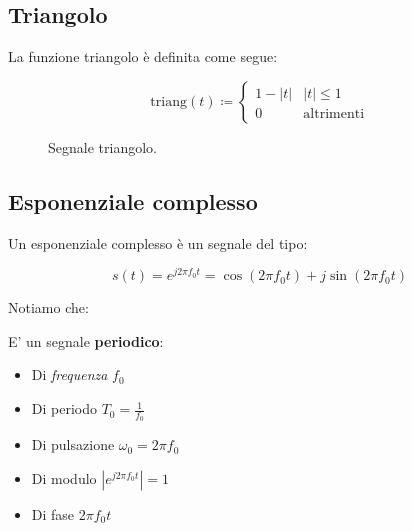 \subsection{Triangolo}

La funzione triangolo è definita come segue:

\begin{definition}[TRIANGOLO]
    \[
        \text{triang}(t) \coloneqq \begin{cases}
            1-|t| & |t| \le 1 \\
            0 & \text{altrimenti}
        \end{cases} 
    \] 
\end{definition}

\begin{figure}[!ht]
    \centering
    \caption{Segnale triangolo.}
    \label{fig:02_03segnale_tri}
\end{figure}

\subsection{Esponenziale complesso}

Un esponenziale complesso è un segnale del tipo:

\begin{definition}
    \[
        s(t) = e^{j 2\pi f_{0}t} = \cos (2\pi f_{0}t) + j \sin (2\pi f_{0}t)
    \] 
\end{definition}

Notiamo che:

\begin{remark}
    E' un segnale \textbf{periodico}:
    \begin{itemize}
        \item Di \textit{frequenza} $f_{0}$
        \item Di periodo $T_{0} = \frac{1}{f_{0}}$
        \item Di pulsazione $\omega_{0} = 2\pi f_{0}$
        \item Di modulo $|e^{j 2\pi f_{0}t}|=1$
        \item Di fase $2\pi f_{0}t$
    \end{itemize}
\end{remark}

